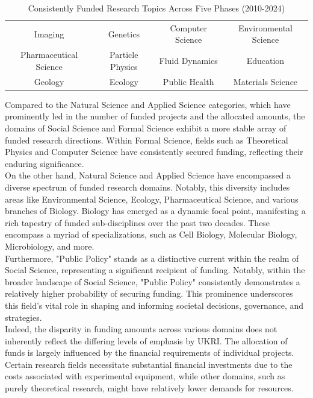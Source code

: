 \begin{table}[H]

    \caption{Consistently Funded Research Topics Across Five Phases (2010-2024)}
    \label{tab: Topic List1}


        \begin{tabular}{ *{4}{c} } 

            \midrule
           Imaging &Genetics &Computer Science&Environmental Science \\
           Pharmaceutical Science&Particle Physics&
           Fluid Dynamics&Education\\
           Geology&Ecology&Public Health &Materials Science\\

            \bottomrule
        \end{tabular}

\end{table}

Compared to the Natural Science and Applied Science categories, which have prominently led in the number of funded projects and the allocated amounts, the domains of Social Science and Formal Science exhibit a more stable array of funded research directions. Within Formal Science, fields such as Theoretical Physics and Computer Science have consistently secured funding, reflecting their enduring significance.\\

On the other hand, Natural Science and Applied Science have encompassed a diverse spectrum of funded research domains. Notably, this diversity includes areas like Environmental Science, Ecology, Pharmaceutical Science, and various branches of Biology. Biology has emerged as a dynamic focal point, manifesting a rich tapestry of funded sub-disciplines over the past two decades. These encompass a myriad of specializations, such as Cell Biology, Molecular Biology, Microbiology, and more.\\

Furthermore, "Public Policy" stands as a distinctive current within the realm of Social Science, representing a significant recipient of funding. Notably, within the broader landscape of Social Science, "Public Policy" consistently demonstrates a relatively higher probability of securing funding. This prominence underscores this field's vital role in shaping and informing societal decisions, governance, and strategies.\\

Indeed, the disparity in funding amounts across various domains does not inherently reflect the differing levels of emphasis by UKRI. The allocation of funds is largely influenced by the financial requirements of individual projects. Certain research fields necessitate substantial financial investments due to the costs associated with experimental equipment, while other domains, such as purely theoretical research, might have relatively lower demands for resources.\\


